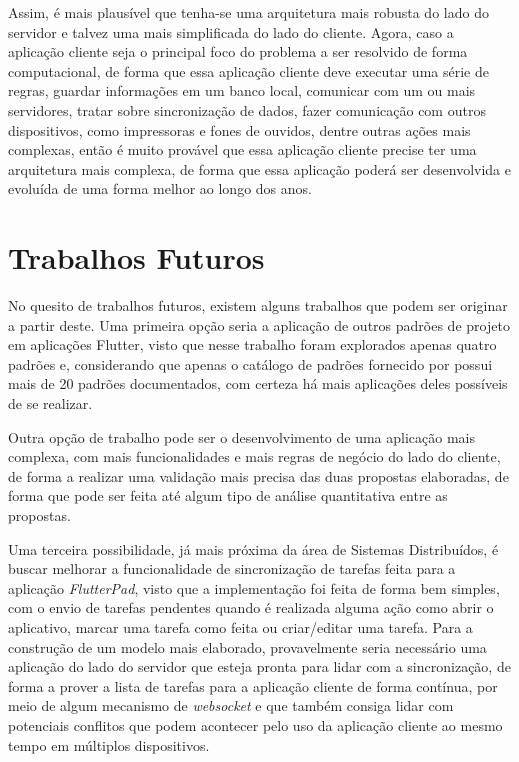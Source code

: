 \documentclass[12pt, %
openright, 
oneside, %
a4paper,    %
brazil]{facom-ufu-abntex2}
\begin{document}
Assim, é mais plausível que tenha-se uma arquitetura mais robusta do lado do servidor e talvez uma mais simplificada do lado do cliente. Agora, caso a aplicação cliente seja o principal foco do problema a ser resolvido de forma computacional, de forma que essa aplicação cliente deve executar uma série de regras, guardar informações em um banco local, comunicar com um ou mais servidores, tratar sobre sincronização de dados, fazer comunicação com outros dispositivos, como impressoras e fones de ouvidos, dentre outras ações mais complexas, então é muito provável que essa aplicação cliente precise ter uma arquitetura mais complexa, de forma que essa aplicação poderá ser desenvolvida e evoluída de uma forma melhor ao longo dos anos.

\section{Trabalhos Futuros} \label{sec:future_work}

No quesito de trabalhos futuros, existem alguns trabalhos que podem ser originar a partir deste. Uma primeira opção seria a aplicação de outros padrões de projeto em aplicações Flutter, visto que nesse trabalho foram explorados apenas quatro padrões e, considerando que apenas o catálogo de padrões fornecido por  possui mais de 20 padrões documentados, com certeza há mais aplicações deles possíveis de se realizar.

Outra opção de trabalho pode ser o desenvolvimento de uma aplicação mais complexa, com mais funcionalidades e mais regras de negócio do lado do cliente, de forma a realizar uma validação mais precisa das duas propostas elaboradas, de forma que pode ser feita até algum tipo de análise quantitativa entre as propostas.

Uma terceira possibilidade, já mais próxima da área de Sistemas Distribuídos, é buscar melhorar a funcionalidade de sincronização de tarefas feita para a aplicação \textit{FlutterPad}, visto que a implementação foi feita de forma bem simples, com o envio de tarefas pendentes quando é realizada alguma ação como abrir o aplicativo, marcar uma tarefa como feita ou criar/editar uma tarefa. Para a construção de um modelo mais elaborado, provavelmente seria necessário uma aplicação do lado do servidor que esteja pronta para lidar com a sincronização, de forma a prover a lista de tarefas para a aplicação cliente de forma contínua, por meio de algum mecanismo de \textit{websocket} e que também consiga lidar com potenciais conflitos que podem acontecer pelo uso da aplicação cliente ao mesmo tempo em múltiplos dispositivos.



\postextual



\end{document}
